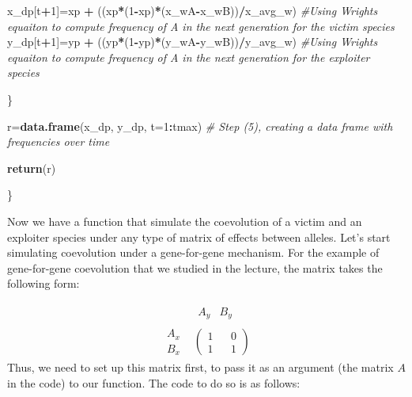 \documentclass[
]{book}
\newenvironment{Shaded}{\begin{snugshade}}{\end{snugshade}}
\newcommand{\AttributeTok}[1]{\textcolor[rgb]{0.13,0.29,0.53}{#1}}
\newcommand{\CommentTok}[1]{\textcolor[rgb]{0.56,0.35,0.01}{\textit{#1}}}
\newcommand{\DecValTok}[1]{\textcolor[rgb]{0.00,0.00,0.81}{#1}}
\newcommand{\FunctionTok}[1]{\textcolor[rgb]{0.13,0.29,0.53}{\textbf{#1}}}
\newcommand{\NormalTok}[1]{#1}
\newcommand{\OtherTok}[1]{\textcolor[rgb]{0.56,0.35,0.01}{#1}}
\newcommand{\SpecialCharTok}[1]{\textcolor[rgb]{0.81,0.36,0.00}{\textbf{#1}}}
\begin{document}
\begin{Shaded}
\begin{Highlighting}[]
\NormalTok{  x\_dp[t}\SpecialCharTok{+}\DecValTok{1}\NormalTok{]}\OtherTok{=}\NormalTok{xp }\SpecialCharTok{+}\NormalTok{ ((xp}\SpecialCharTok{*}\NormalTok{(}\DecValTok{1}\SpecialCharTok{{-}}\NormalTok{xp)}\SpecialCharTok{*}\NormalTok{(x\_wA}\SpecialCharTok{{-}}\NormalTok{x\_wB))}\SpecialCharTok{/}\NormalTok{x\_avg\_w) }\CommentTok{\#Using Wright\textquotesingle{}s equaiton to compute frequency of A in the next generation for the victim species}
\NormalTok{  y\_dp[t}\SpecialCharTok{+}\DecValTok{1}\NormalTok{]}\OtherTok{=}\NormalTok{yp }\SpecialCharTok{+}\NormalTok{ ((yp}\SpecialCharTok{*}\NormalTok{(}\DecValTok{1}\SpecialCharTok{{-}}\NormalTok{yp)}\SpecialCharTok{*}\NormalTok{(y\_wA}\SpecialCharTok{{-}}\NormalTok{y\_wB))}\SpecialCharTok{/}\NormalTok{y\_avg\_w) }\CommentTok{\#Using Wright\textquotesingle{}s equaiton to compute frequency of A in the next generation for the exploiter species}
  
\NormalTok{\}}

\NormalTok{r}\OtherTok{=}\FunctionTok{data.frame}\NormalTok{(x\_dp, y\_dp, }\AttributeTok{t=}\DecValTok{1}\SpecialCharTok{:}\NormalTok{tmax) }\CommentTok{\# Step (5), creating a data frame with frequencies over time}

\FunctionTok{return}\NormalTok{(r)}
  
\NormalTok{\}}
\end{Highlighting}
\end{Shaded}

Now we have a function that simulate the coevolution of a victim and an exploiter species under any type of matrix of effects between alleles. Let's start simulating coevolution under a gene-for-gene mechanism. For the example of gene-for-gene coevolution that we studied in the lecture, the matrix takes the following form:

\[
\begin{array}{cc} &
\begin{array}{cc} A_{y} & B_{y} \end{array}
\\
\begin{array}{cc}
A_{x} \\
B_{x} \end{array}
&
\left(
\begin{array}{cc}
1 && 0 \\
1 && 1 \end{array}
\right)\end{array}
\]
Thus, we need to set up this matrix first, to pass it as an argument (the matrix \(A\) in the code) to our function. The code to do so is as follows:
\end{document}

